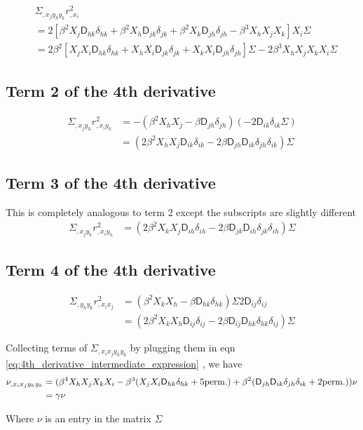 \begin{align*}
&\Sigma_{,x_j y_h y_k} r_{,x_i}^2\\
&= 2[\beta^2 X_j \mathsf{D}_{hk} \delta_{hk} + \beta^2 X_h \mathsf{D}_{jk}\delta_{jk} +
\beta^2 X_k \mathsf{D}_{jh} \delta_{jh} - \beta^3 X_h X_j X_k] X_i \Sigma\\ 
&=\boxed{2\beta^2[ 
X_j X_i \mathsf{D}_{hk} \delta_{hk} + 
X_h X_i \mathsf{D}_{jk} \delta_{jk} + 
X_k X_i \mathsf{D}_{jh} \delta_{jh}] \Sigma 
- 2\beta^3 X_h X_j X_k X_i \Sigma} 
\end{align*}

\subsection{Term 2 of the 4th derivative}
\begin{align*}
\Sigma_{,x_j y_h} r^2_{,x_i y_k}
&= - (\beta^2 X_h X_j - \beta \mathsf{D}_{jh} \delta_{jh}) (-2\mathsf{D}_{ik}
\delta_{ik} \Sigma) \\  
&= \boxed{( 2 \beta^2  X_h X_j \mathsf{D}_{ik} \delta_{ik} 
-2 \beta \mathsf{D}_{jh} \mathsf{D}_{ik} \delta_{jh} \delta_{ik}) \Sigma} 
\end{align*}

\subsection{Term 3 of the 4th derivative}
This is completely analogous to term 2 except the subscripts are slightly
different
\begin{align*}
\Sigma_{,x_j y_k} r^2_{,x_i y_h}
&=\boxed { ( 2 \beta^2  X_k X_j \mathsf{D}_{ih} \delta_{ih} 
-2 \beta \mathsf{D}_{jk} \mathsf{D}_{ih} \delta_{jk} \delta_{ih}) \Sigma} 
\end{align*}

\subsection{Term 4 of the 4th derivative} 
\begin{align*}
\Sigma_{,y_h y_k} r^2_{,x_i x_j}
&= (\beta^2 X_k X_h - \beta \mathsf{D}_{hk}\delta_{hk})\Sigma 2 \mathsf{D}_{ij} \delta_{ij}\\ 
&= \boxed{(2\beta^2 X_k X_h \mathsf{D}_{ij} \delta_{ij} - 2\beta \mathsf{D}_{ij} \mathsf{D}_{hk} \delta_{hk}
\delta_{ij})\Sigma } 
\end{align*}

Collecting terms of $\Sigma_{,x_i x_j y_h y_k}$ by plugging them in eqn
\ref{eq:4th_derivative_intermediate_expression}
, we have 
\begin{align}
\nu_{,x_i x_j y_h y_k} &= (\beta^4 X_h X_j X_k X_i -  
\beta^3 (X_j X_i \mathsf{D}_{hk} \delta_{hk} + 5 {\rm perm.}) + \beta^2
(\mathsf{D}_{jh} \mathsf{D}_{ik}\delta_{jh}\delta_{ik} + 2 {\rm perm.})) \nu \\
&= \gamma \nu
\end{align}

Where $\nu$ is an entry in the matrix $\Sigma$

